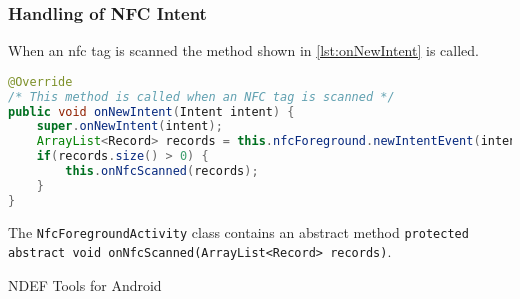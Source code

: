\subsubsection{Handling of NFC Intent}
When an \ac{nfc} tag is scanned the method shown in \autoref{lst:onNewIntent} is called.
\begin{lstlisting}[language=java, label=lst:onNewIntent, caption=onNewIntent]
@Override
/* This method is called when an NFC tag is scanned */
public void onNewIntent(Intent intent) { 
    super.onNewIntent(intent);
    ArrayList<Record> records = this.nfcForeground.newIntentEvent(intent);
    if(records.size() > 0) {
        this.onNfcScanned(records);
    }
}  
\end{lstlisting}

The \lstinline|NfcForegroundActivity| class contains an abstract method \lstinline|protected abstract void onNfcScanned(ArrayList<Record> records)|. 


NDEF Tools for Android \citep{ndeftools}